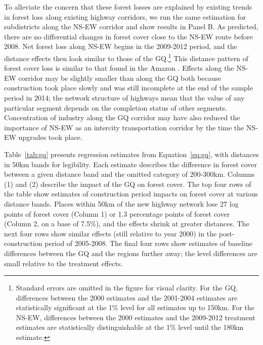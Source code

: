 To alleviate the concern that these forest losses are explained by
existing trends in forest loss along existing highway corridors, we
run the same estimation for subdistricts along the NS-EW corridor and
show results in Panel B. As predicted, there are no differential changes
in forest cover close to the NS-EW route before 2008. Net forest
loss along NS-EW begins in the 2009-2012 period, and the distance effects then
look similar to those of the GQ.\footnote{Standard errors are omitted
  in the figure for visual clarity. For the GQ, differences between
  the 2000 estimates and the 2001-2004 estimates are statistically
  significant at the 1\% level for all estimates up to 150km. For the
  NS-EW, differences between the 2000 estimates and the 2009-2012
  treatment estimates are statistically distinguishable at the 1\%
  level until the 180km estimate.} This distance pattern of forest
cover loss is similar to that found in the Amazon \cite{PR07}. 
Effects along the NS-EW
corridor may be slightly smaller than along the GQ both because construction
took place slowly and was still incomplete at the end of the sample
period in 2014; the network
structure of highways mean that the value of any particular segment
depends on the completion status of other segments. Concentration of
industry along the GQ corridor may have also reduced the importance of
NS-EW as an intercity transportation corridor by the time the NS-EW
upgrades took place. 

 Table~\ref{tab:gq} presents regression estimates from
Equation~\ref{eq:gq}, with distances in 50km bands for legibility.
Each estimate describes the difference in forest cover between a given
distance band and the omitted category of 200-300km. Columns (1) and
(2) describe the impact of the GQ on forest cover.  The top four rows
of the table show estimates of construction period impacts on forest
cover at various distance bands. Places within 50km of the new highway
network lose 27 log points of forest cover (Column 1) or 1.3
percentage points of forest cover (Column 2, on a base of 7.5\%), and
the effects shrink at greater distances. The next four rows show
similar effects (still relative to year 2000) in the post-construction
period of 2005-2008. The final four rows show estimates of baseline
differences between the GQ and the regions further away; the level
differences are small relative to the treatment effects.

